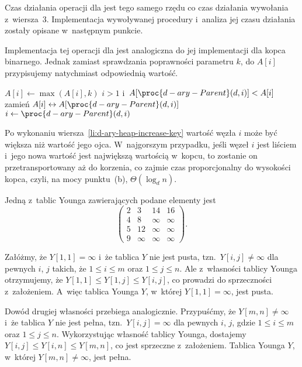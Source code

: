 Czas działania operacji  dla  jest tego samego rzędu co czas działania wywołania z~wiersza~3. Implementacja wywoływanej procedury  i~analiza jej czasu działania zostały opisane w~następnym punkcie.

\subproblem %
Implementacja tej operacji dla  jest analogiczna do jej implementacji dla kopca binarnego. Jednak zamiast sprawdzania poprawności parametru $k$, do $A[i]$ przypisujemy natychmiast odpowiednią wartość.
\begin{codebox}
\li	$A[i]\gets\max(A[i],k)$ \label{li:d-ary-heap-increase-key}
\li	\While $i>1$ i~$A[\proc{d-ary-Parent}(d,i)]<A[i]$
\li		\Do
			zamień $A[i]\leftrightarrow A[\proc{d-ary-Parent}(d,i)]$
\li			$i\gets\proc{d-ary-Parent}(d,i)$
		\End
\end{codebox}

Po wykonaniu wiersza~\ref{li:d-ary-heap-increase-key} wartość węzła $i$ może być większa niż wartość jego ojca. W~najgorszym przypadku, jeśli węzeł $i$ jest liściem i~jego nowa wartość jest największą wartością w~kopcu, to zostanie on przetransportowany aż do korzenia, co zajmie czas proporcjonalny do wysokości kopca, czyli, na mocy punktu~(b), $\Theta(\log_dn)$.


\subproblem %
Jedną z~tablic Younga zawierających podane elementy jest
\[
	\begin{pmatrix}
		2 & 3 & 14 & 16 \\
		4 & 8 & \infty & \infty \\
		5 & 12 & \infty & \infty \\
		9 & \infty & \infty & \infty
	\end{pmatrix}.
\]

\subproblem %
Załóżmy, że $Y[1,1]=\infty$ i~że tablica $Y$ nie jest pusta, tzn.\ $Y[i,j]\ne\infty$ dla pewnych $i$, $j$ takich, że $1\le i\le m$ oraz $1\le j\le n$. Ale z~własności tablicy Younga otrzymujemy, że $Y[1,1]\le Y[1,j]\le Y[i,j]$, co prowadzi do sprzeczności z~założeniem. A~więc tablica Younga $Y$, w~której $Y[1,1]=\infty$, jest pusta.

Dowód drugiej własności przebiega analogicznie. Przypuśćmy, że $Y[m,n]\ne\infty$ i~że tablica $Y$ nie jest pełna, tzn.\ $Y[i,j]=\infty$ dla pewnych $i$, $j$, gdzie $1\le i\le m$ oraz $1\le j\le n$. Wykorzystując własność tablicy Younga, dostajemy $Y[i,j]\le Y[i,n]\le Y[m,n]$, co jest sprzeczne z~założeniem. Tablica Younga $Y$, w~której $Y[m,n]\ne\infty$, jest pełna.

